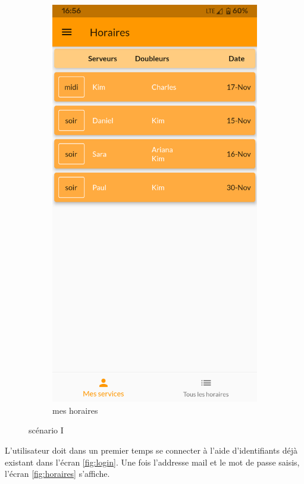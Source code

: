 \begin{figure}[!h]
\begin{subfigure}{.3\textwidth}
        \includegraphics[width=0.9\linewidth]{screenshots/scenario_01/mesHoraires.png}
        \caption{mes horaires}
        \label{fig:mesHoraires}
    \end{subfigure}
    \caption{scénario I}
    \label{fig:scen01}
\end{figure}

L'utilisateur doit dans un premier temps se connecter à l'aide d'identifiants déjà existant dans l'écran \ref{fig:login}. Une fois l'addresse mail et le mot de passe saisis, 
l'écran \ref{fig:horaires} s'affiche. 

